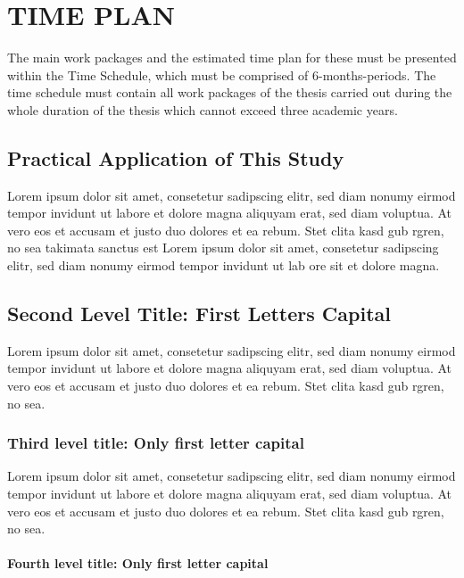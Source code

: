 \chapter{TIME PLAN}\label{Ch7}

The main work packages and the estimated time plan for these must be presented within the Time Schedule, which must be comprised of 6-months-periods. The time schedule must contain all work packages of the thesis carried out during the whole duration of the thesis which cannot exceed three academic years. 

\section{Practical Application of This Study}

Lorem ipsum dolor sit amet, consetetur sadipscing elitr, sed diam nonumy eirmod tempor invidunt ut labore et dolore magna aliquyam erat, sed diam voluptua. At vero eos et accusam et justo duo dolores et ea rebum. Stet clita kasd gub rgren, no sea takimata sanctus est Lorem ipsum dolor sit amet, consetetur sadipscing elitr, sed diam nonumy eirmod tempor invidunt ut lab ore sit et dolore magna.

\section{Second Level Title: First Letters Capital}

Lorem ipsum dolor sit amet, consetetur sadipscing elitr, sed diam nonumy eirmod tempor invidunt ut labore et dolore magna aliquyam erat, sed diam voluptua. At vero eos et accusam et justo duo dolores et ea rebum. Stet clita kasd gub rgren, no sea.

\subsection{Third level title: Only first letter capital}

Lorem ipsum dolor sit amet, consetetur sadipscing elitr, sed diam nonumy eirmod tempor invidunt ut labore et dolore magna aliquyam erat, sed diam voluptua. At vero eos et accusam et justo duo dolores et ea rebum. Stet clita kasd gub rgren, no sea.

\subsubsection{Fourth level title: Only first letter capital}

